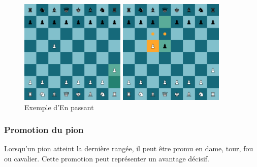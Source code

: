 \documentclass{article}
\begin{document}
\begin{figure}[H]
    \centering
    \begin{minipage}[b]{0.45\textwidth}
        \centering
        \includegraphics[width=\textwidth,height=5cm,keepaspectratio]{enpassant1.png}
    \end{minipage}
    \hspace{0.005\textwidth}
    \begin{minipage}[b]{0.45\textwidth}
        \centering
        \includegraphics[width=\textwidth,height=5cm,keepaspectratio]{enpassant2.png}
    \end{minipage}
    \caption{Exemple d'En passant}
\end{figure}

\subsubsection*{Promotion du pion}
Lorsqu'un pion atteint la dernière rangée, il peut être promu en dame, tour, fou ou cavalier. Cette promotion peut représenter un avantage décisif.
\end{document}
